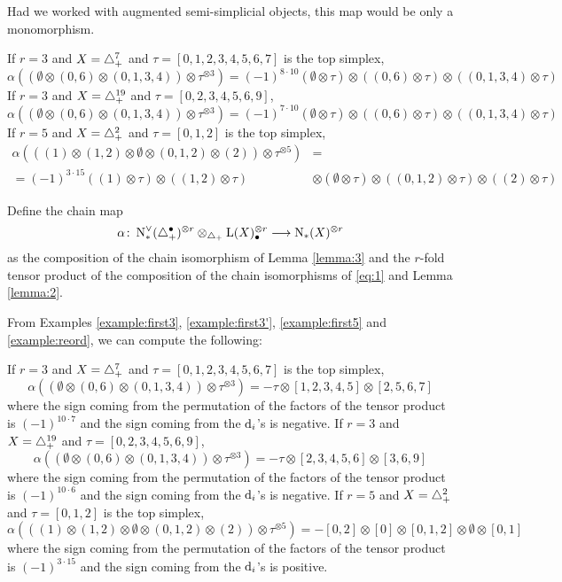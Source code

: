 \begin{remark}
	Had we worked with augmented semi-simplicial objects, this map would be only a monomorphism.
\end{remark}
\begin{example}\label{example:reord} If $r=3$ and $X=\triangle_{+}^7$ and $\tau = [0,1,2,3,4,5,6,7]$ is the top simplex,
\[
		\alpha((\emptyset\otimes (0,6)\otimes (0,1,3,4))\otimes \tau^{\otimes 3}) = (-1)^{8\cdot 10}(\emptyset\otimes \tau)\otimes ((0,6)\otimes \tau)\otimes ((0,1,3,4)\otimes \tau)
	\]
 If $r=3$ and $X=\triangle_{+}^{19}$ and $\tau = [0,2,3,4,5,6,9]$,
\[
		\alpha((\emptyset\otimes (0,6)\otimes (0,1,3,4))\otimes \tau^{\otimes 3}) = (-1)^{7\cdot 10}(\emptyset\otimes \tau)\otimes ((0,6)\otimes \tau)\otimes ((0,1,3,4)\otimes \tau)
	\]
 If $r=5$ and $X=\triangle_{+}^2$ and $\tau = [0,1,2]$ is the top simplex,
	\[
	\begin{split}
		\alpha(((1)\otimes (1,2)\otimes \emptyset\otimes (0,1,2)\otimes (2))\otimes \tau^{\otimes 5}) &=
		\\
		=(-1)^{3\cdot 15}((1)\otimes \tau) \otimes ((1,2)\otimes \tau)&\otimes (\emptyset\otimes \tau)\otimes ((0,1,2)\otimes \tau)\otimes ((2)\otimes \tau)
		\end{split}
	\]
	\end{example}

\begin{definition} Define the chain map
	\[\alpha\colon \operatorname{N}^\vee_{*}(\triangle_{+}^\bullet)^{\otimes r}\otimes_{\triangle_{+}} \operatorname{L}(X)_\bullet^{\otimes r}\longrightarrow \operatorname{N}_{*}(X)^{\otimes r}\]
as the composition of the chain isomorphism of Lemma \ref{lemma:3} and the $r$-fold tensor product of the composition of the chain isomorphisms of \eqref{eq:1} and Lemma \ref{lemma:2}. 
\end{definition}


From Examples \ref{example:first3}, \ref{example:first3'}, \ref{example:first5} and \ref{example:reord}, we can compute the following: 
\begin{example}\label{example:alpha} If $r=3$ and $X=\triangle_{+}^7$ and $\tau = [0,1,2,3,4,5,6,7]$ is the top simplex,
\[
		\alpha((\emptyset\otimes (0,6)\otimes (0,1,3,4))\otimes \tau^{\otimes 3}) = -\tau\otimes [1,2,3,4,5]\otimes [2,5,6,7]
	\]
	where the sign coming from the permutation of the factors of the tensor product is $(-1)^{10\cdot 7}$ and the sign coming from the $\operatorname{d}_i$'s is negative. If $r=3$ and $X=\triangle_{+}^{19}$ and $\tau = [0,2,3,4,5,6,9]$,
\[
		\alpha((\emptyset\otimes (0,6)\otimes (0,1,3,4))\otimes \tau^{\otimes 3}) = -\tau\otimes [2,3,4,5,6]\otimes [3,6,9]
	\]
	where the sign coming from the permutation of the factors of the tensor product is $(-1)^{10\cdot 6}$ and the sign coming from the $\operatorname{d}_i$'s is negative. If $r=5$ and $X=\triangle_{+}^2$ and $\tau = [0,1,2]$ is the top simplex,
	\[
		\alpha(((1)\otimes (1,2)\otimes \emptyset\otimes (0,1,2)\otimes (2))\otimes \tau^{\otimes 5}) = -[0,2]\otimes [0]\otimes [0,1,2]\otimes \emptyset\otimes [0,1]
	\]
		where the sign coming from the permutation of the factors of the tensor product is $(-1)^{3\cdot 15}$ and the sign coming from the $\operatorname{d}_i$'s is positive.
	\end{example}
